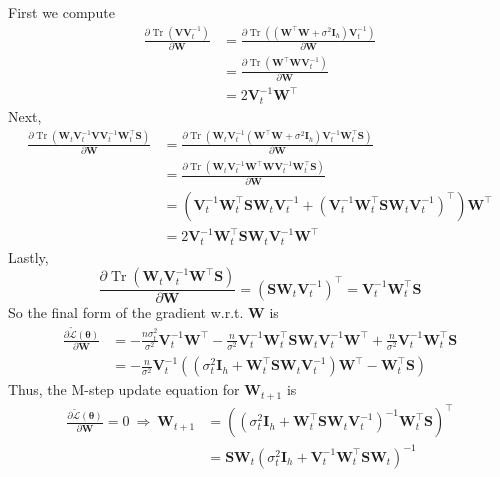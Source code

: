 \documentclass[11pt]{article}
\DeclareMathOperator{\tr}{Tr}
\begin{document}
\begin{enumerate}
\begin{enumerate}
    First we compute
    \begin{align*}
    \frac{\partial\tr\left(\bm V\bm V_t^{-1}\right)}{\partial\bm W}
    &= \frac{\partial\tr\left((\bm W^{\top}\bm W+\sigma^2\bm I_h)\bm V_t^{-1}\right)}{\partial\bm W} \\
    &= \frac{\partial\tr\left(\bm W^{\top}\bm W\bm V_t^{-1}\right)}{\partial\bm W} \\
    &= 2\bm V_t^{-1}\bm W^{\top}
    \end{align*}
    Next,
    \begin{align*}
    \frac{\partial\tr\left(\bm W_t\bm V_t^{-1}\bm V\bm V_t^{-1}\bm W_t^{\top}\bm S\right)}{\partial\bm W}
    &= \frac{\partial\tr\left(\bm W_t\bm V_t^{-1}(\bm W^{\top}\bm W+\sigma^2\bm I_h)\bm V_t^{-1}\bm W_t^{\top}\bm S\right)}{\partial\bm W} \\
    &= \frac{\partial\tr\left(\bm W_t\bm V_t^{-1}\bm W^{\top}\bm W\bm V_t^{-1}\bm W_t^{\top}\bm S\right)}{\partial\bm W} \\
    &= \left(\bm V_t^{-1}\bm W_t^{\top}\bm S\bm W_t\bm V_t^{-1}+\left(\bm V_t^{-1}\bm W_t^{\top}\bm S\bm W_t\bm V_t^{-1}\right)^{\top}\right)\bm W^{\top} \\
    &= 2\bm V_t^{-1}\bm W_t^{\top}\bm S\bm W_t\bm V_t^{-1}\bm W^{\top}
    \end{align*}
    Lastly,
    \[\frac{\partial\tr\left(\bm W_t\bm V_t^{-1}\bm W^{\top}\bm S\right)}{\partial\bm W}=\left(\bm S\bm W_t\bm V_t^{-1}\right)^{\top}=\bm V_t^{-1}\bm W_t^{\top}\bm S\]
    So the final form of the gradient w.r.t. $\bm W$ is
    \begin{align*}
    \frac{\partial\tilde{\mathcal{L}}(\bm\theta)}{\partial\bm W}
    &= -\frac{n\sigma_t^2}{\sigma^2}\bm V_t^{-1}\bm W^{\top}-\frac{n}{\sigma^2}\bm V_t^{-1}\bm W_t^{\top}\bm S\bm W_t\bm V_t^{-1}\bm W^{\top}+\frac{n}{\sigma^2}\bm V_t^{-1}\bm W_t^{\top}\bm S \\
    &= -\frac{n}{\sigma^2}\bm V_t^{-1}\left(\left(\sigma_t^2\bm I_h+\bm W_t^{\top}\bm S\bm W_t\bm V_t^{-1}\right)\bm W^{\top}-\bm W_t^{\top}\bm S\right)
    \end{align*}
    Thus, the M-step update equation for $\bm W_{t+1}$ is
    \begin{align*}
    \frac{\partial\tilde{\mathcal{L}}(\bm\theta)}{\partial\bm W}=0\ \Rightarrow\ 
    \bm W_{t+1} &= \left(\left(\sigma_t^2\bm I_h+\bm W_t^{\top}\bm S\bm W_t\bm V_t^{-1}\right)^{-1}\bm W_t^{\top}\bm S\right)^{\top} \\
    &= \bm S\bm W_t\left(\sigma_t^2\bm I_h+\bm V_t^{-1}\bm W_t^{\top}\bm S\bm W_t\right)^{-1}

\end{align*}
\end{enumerate}
\end{enumerate}
\end{document}
